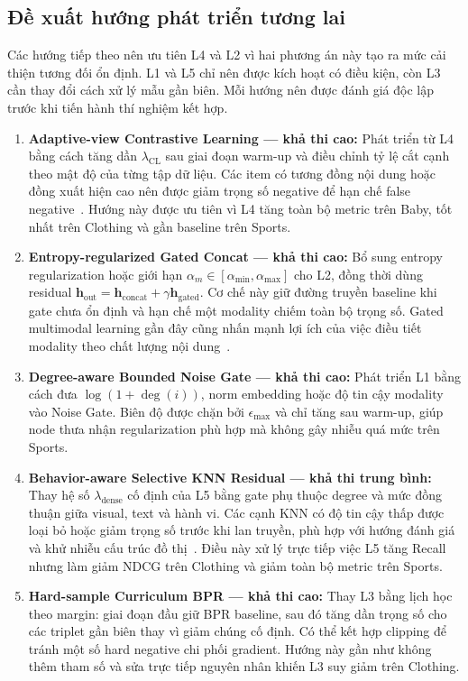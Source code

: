 \subsection{Đề xuất hướng phát triển tương lai}

Các hướng tiếp theo nên ưu tiên L4 và L2 vì hai phương án này tạo ra mức cải thiện tương đối ổn định. L1 và L5 chỉ nên được kích hoạt có điều kiện, còn L3 cần thay đổi cách xử lý mẫu gần biên. Mỗi hướng nên được đánh giá độc lập trước khi tiến hành thí nghiệm kết hợp.

\begin{enumerate}[leftmargin=*,label=\textbf{Hướng \arabic*.}]
    \item \textbf{Adaptive-view Contrastive Learning --- khả thi cao:}
    Phát triển từ L4 bằng cách tăng dần $\lambda_{\mathrm{CL}}$ sau giai đoạn warm-up và điều chỉnh tỷ lệ cắt cạnh theo mật độ của từng tập dữ liệu. Các item có tương đồng nội dung hoặc đồng xuất hiện cao nên được giảm trọng số negative để hạn chế false negative~\cite{balmaseda2025glofnd}. Hướng này được ưu tiên vì L4 tăng toàn bộ metric trên Baby, tốt nhất trên Clothing và gần baseline trên Sports.

    \item \textbf{Entropy-regularized Gated Concat --- khả thi cao:}
    Bổ sung entropy regularization hoặc giới hạn $\alpha_m\in[\alpha_{\min},\alpha_{\max}]$ cho L2, đồng thời dùng residual
    $\mathbf h_{\mathrm{out}}=\mathbf h_{\mathrm{concat}}+\gamma\mathbf h_{\mathrm{gated}}$.
    Cơ chế này giữ đường truyền baseline khi gate chưa ổn định và hạn chế một modality chiếm toàn bộ trọng số. Gated multimodal learning gần đây cũng nhấn mạnh lợi ích của việc điều tiết modality theo chất lượng nội dung~\cite{liu2025gated}.

    \item \textbf{Degree-aware Bounded Noise Gate --- khả thi cao:}
    Phát triển L1 bằng cách đưa $\log(1+\deg(i))$, norm embedding hoặc độ tin cậy modality vào Noise Gate. Biên độ được chặn bởi $\epsilon_{\max}$ và chỉ tăng sau warm-up, giúp node thưa nhận regularization phù hợp mà không gây nhiễu quá mức trên Sports.

    \item \textbf{Behavior-aware Selective KNN Residual --- khả thi trung bình:}
    Thay hệ số $\lambda_{\mathrm{dense}}$ cố định của L5 bằng gate phụ thuộc degree và mức đồng thuận giữa visual, text và hành vi. Các cạnh KNN có độ tin cậy thấp được loại bỏ hoặc giảm trọng số trước khi lan truyền, phù hợp với hướng đánh giá và khử nhiễu cấu trúc đồ thị~\cite{qi2025even}. Điều này xử lý trực tiếp việc L5 tăng Recall nhưng làm giảm NDCG trên Clothing và giảm toàn bộ metric trên Sports.

    \item \textbf{Hard-sample Curriculum BPR --- khả thi cao:}
    Thay L3 bằng lịch học theo margin: giai đoạn đầu giữ BPR baseline, sau đó tăng dần trọng số cho các triplet gần biên thay vì giảm chúng cố định. Có thể kết hợp clipping để tránh một số hard negative chi phối gradient. Hướng này gần như không thêm tham số và sửa trực tiếp nguyên nhân khiến L3 suy giảm trên Clothing.
\end{enumerate}

